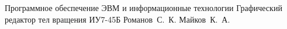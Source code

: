 \documentclass[a4paper,14pt]{bmstu}
\begin{document}
{Программное обеспечение ЭВМ и информационные технологии} %
{Графический редактор тел вращения} %
{ИУ7-45Б} %
{Романов~С.~К.} %
{Майков~К.~А.} %
{}
{}




\maketableofcontents








%
%

\makebibliography

%
\end{document}
